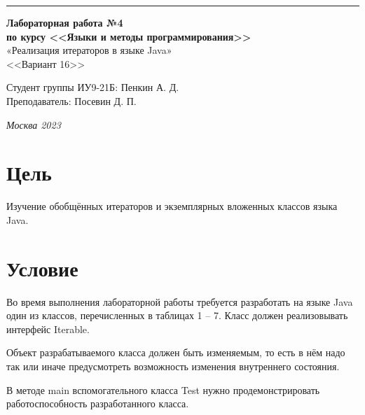 ﻿\documentclass[a4paper, 12pt]{extarticle}
\begin{document}
\begin{titlepage}
\vspace*{-16pt}
\hspace{30pt}\rule{0.866\textwidth}{0.4pt}
  
\vspace{6em}

\begin{center}
\Large {\bf Лабораторная работа №4} \\ 
\large {\bf по курсу <<Языки и методы программирования>>} \\ 
\large «Реализация итераторов в языке Java» \\
\large <<Вариант 16>>
\end{center}\normalsize

\vspace{15em}


\begin{flushright}
  {Студент группы ИУ9-21Б: Пенкин А. Д.\hspace*{15pt} \\
  \vspace{2ex}
  Преподаватель: Посевин Д. П.\hspace*{15pt}}
\end{flushright}

\bigskip

\vfill
 \vspace{7em}

\begin{center}
\textsl{Москва 2023}
\end{center}
\end{titlepage}

\renewcommand{\ttdefault}{pcr}

\setlength{\tabcolsep}{3pt}
\newpage
\setcounter{page}{2}

\section{Цель}\label{Sect::task}
\par
Изучение обобщённых итераторов и экземплярных вложенных классов языка Java. 
\section{Условие}
Во время выполнения лабораторной работы требуется разработать на языке Java один из классов, перечисленных в таблицах 1 – 7. Класс должен реализовывать интерфейс Iterable.
\par
Объект разрабатываемого класса должен быть изменяемым, то есть в нём надо так
или иначе предусмотреть возможность изменения внутреннего состояния.
\par
В методе main вспомогательного класса Test нужно продемонстрировать
работоспособность разработанного класса.
\end{document}
